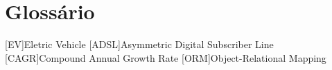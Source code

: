 \chapter{Glossário}

\footnotesize
\SingleSpacing

\begin{multicols}{2}
\begin{acronym}[AAAAAA]

	[EV]{Eletric Vehicle}
	[ADSL]{Asymmetric Digital Subscriber Line}
	[CAGR]{Compound Annual Growth Rate}
	[ORM]{Object-Relational Mapping}
	

\end{acronym}
\end{multicols}

